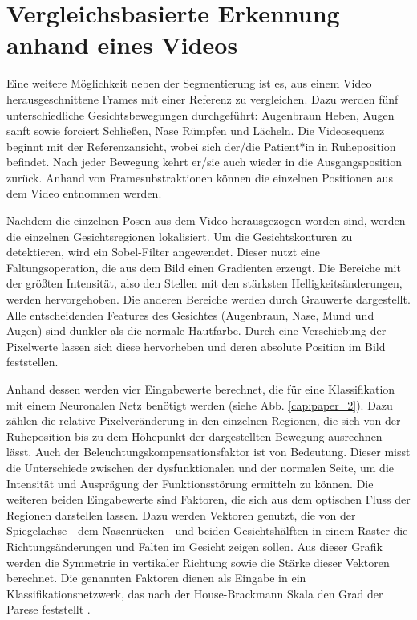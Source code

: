 \section{Vergleichsbasierte Erkennung anhand eines Videos}\label{compare}

Eine weitere Möglichkeit neben der Segmentierung ist es, aus einem Video herausgeschnittene Frames mit einer Referenz zu vergleichen. Dazu werden fünf unterschiedliche Gesichtsbewegungen durchgeführt: Augenbraun Heben, Augen sanft sowie forciert Schließen, Nase Rümpfen und Lächeln. Die Videosequenz beginnt mit der Referenzansicht, wobei sich der/die Patient*in in Ruheposition befindet. Nach jeder Bewegung kehrt er/sie auch wieder in die Ausgangsposition zurück. Anhand von Framesubstraktionen können die einzelnen Positionen aus dem Video entnommen werden.

Nachdem die einzelnen Posen aus dem Video herausgezogen worden sind, werden die einzelnen Gesichtsregionen lokalisiert. Um die Gesichtskonturen zu detektieren, wird ein Sobel-Filter angewendet. Dieser nutzt eine Faltungsoperation, die aus dem Bild einen Gradienten erzeugt. Die Bereiche mit der größten Intensität, also den Stellen mit den stärksten Helligkeitsänderungen, werden hervorgehoben. Die anderen Bereiche werden durch Grauwerte dargestellt. Alle entscheidenden Features des Gesichtes (Augenbraun, Nase, Mund und Augen) sind dunkler als die normale Hautfarbe. Durch eine Verschiebung der Pixelwerte lassen sich diese hervorheben und deren absolute Position im Bild feststellen.

Anhand dessen werden vier Eingabewerte berechnet, die für eine Klassifikation mit einem Neuronalen Netz benötigt werden (siehe Abb. \ref{cap:paper_2}). Dazu zählen die relative Pixelveränderung in den einzelnen Regionen, die sich von der Ruheposition bis zu dem Höhepunkt der dargestellten Bewegung ausrechnen lässt. Auch der Beleuchtungskompensationsfaktor ist von Bedeutung. Dieser misst die Unterschiede zwischen der dysfunktionalen und der normalen Seite, um die Intensität und Ausprägung der Funktionsstörung ermitteln zu können. Die weiteren beiden Eingabewerte sind Faktoren, die sich aus dem optischen Fluss der Regionen darstellen lassen. Dazu werden Vektoren genutzt, die von der Spiegelachse - dem Nasenrücken - und beiden Gesichtshälften in einem Raster die Richtungsänderungen und Falten im Gesicht zeigen sollen. Aus dieser Grafik werden die Symmetrie in vertikaler Richtung sowie die Stärke dieser Vektoren berechnet. Die genannten Faktoren dienen als Eingabe in ein Klassifikationsnetzwerk, das nach der House-Brackmann Skala den Grad der Parese feststellt \cite{detection_fp1}.

